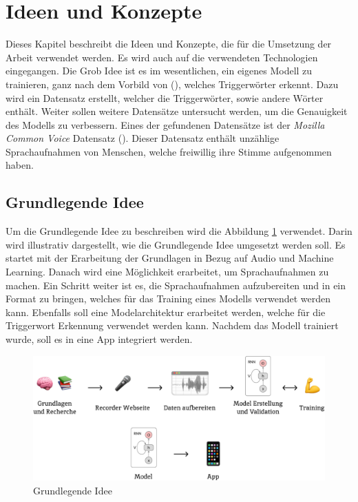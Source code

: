 \documentclass[11pt,a4paper]{article}
\begin{document}
\newpage \section{Ideen und Konzepte}
Dieses Kapitel beschreibt die Ideen und Konzepte, die für die Umsetzung der Arbeit verwendet
werden. Es wird auch auf die verwendeten Technologien eingegangen. Die Grob Idee ist es im 
wesentlichen, ein eigenes Modell zu trainieren, ganz nach dem Vorbild von (\cite{siri2017hey}), 
welches Triggerwörter erkennt. Dazu wird ein Datensatz erstellt, welcher die Triggerwörter, 
sowie andere Wörter enthält. Weiter sollen weitere Datensätze untersucht werden, um die 
Genauigkeit des Modells zu verbessern. Eines der gefundenen Datensätze ist der 
\textit{Mozilla Common Voice} Datensatz (\cite{ardila2020common}). Dieser Datensatz enthält 
unzählige Sprachaufnahmen von Menschen, welche freiwillig ihre Stimme aufgenommen haben. 

\subsection{Grundlegende Idee}
Um die Grundlegende Idee zu beschreiben wird die Abbildung \ref{fig:basic_idea} verwendet. Darin 
wird illustrativ dargestellt, wie die Grundlegende Idee umgesetzt werden soll. Es startet mit der
Erarbeitung der Grundlagen in Bezug auf Audio und Machine Learning. Danach wird eine Möglichkeit
erarbeitet, um Sprachaufnahmen zu machen. Ein Schritt weiter ist es, die Sprachaufnahmen
aufzubereiten und in ein Format zu bringen, welches für das Training eines Modells verwendet werden
kann. Ebenfalls soll eine Modelarchitektur erarbeitet werden, welche für die Triggerwort Erkennung
verwendet werden kann. Nachdem das Modell trainiert wurde, soll es in eine App integriert werden.

\begin{figure}[h]
	\centering
	\includegraphics[width=0.85\linewidth]{img/basic_idea.pdf}
	\caption{Grundlegende Idee}
	\label{fig:basic_idea}
\end{figure}
\end{document}
